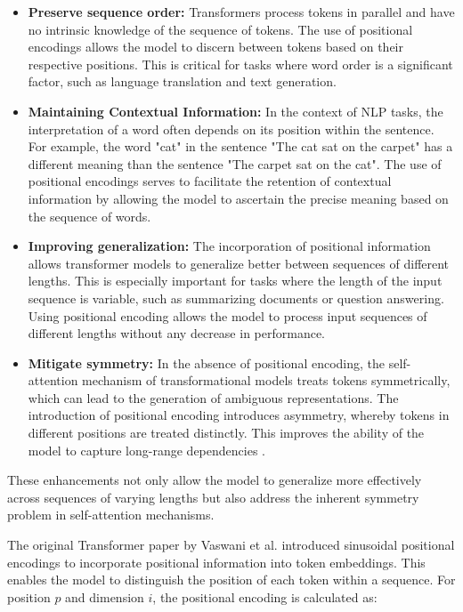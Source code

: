 \begin{itemize}
    \item \textbf{Preserve sequence order:} Transformers process tokens in parallel and have no intrinsic knowledge of the sequence of tokens. The use of positional encodings allows the model to discern between tokens based on their respective positions. This is critical for tasks where word order is a significant factor, such as language translation and text generation.
    
    \item \textbf{Maintaining Contextual Information:} In the context of NLP tasks, the interpretation of a word often depends on its position within the sentence. For example, the word "cat" in the sentence "The cat sat on the carpet" has a different meaning than the sentence "The carpet sat on the cat". The use of positional encodings serves to facilitate the retention of contextual information by allowing the model to ascertain the precise meaning based on the sequence of words.
    
    \item \textbf{Improving generalization:} The incorporation of positional information allows transformer models to generalize better between sequences of different lengths. This is especially important for tasks where the length of the input sequence is variable, such as summarizing documents or question answering. Using positional encoding allows the model to process input sequences of different lengths without any decrease in performance.
    
    \item \textbf{Mitigate symmetry:} In the absence of positional encoding, the self-attention mechanism of transformational models treats tokens symmetrically, which can lead to the generation of ambiguous representations. The introduction of positional encoding introduces asymmetry, whereby tokens in different positions are treated distinctly. This improves the ability of the model to capture long-range dependencies \cite{geeksforgeeks2024-pe}.
\end{itemize}

These enhancements not only allow the model to generalize more effectively across sequences of varying lengths but also address the inherent symmetry problem in self-attention mechanisms.

The original Transformer paper by Vaswani et al. \cite{vaswani2017attention} introduced sinusoidal positional encodings to incorporate positional information into token embeddings. This enables the model to distinguish the position of each token within a sequence. For position \( p \) and dimension \( i \), the positional encoding is calculated as:

